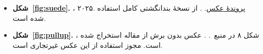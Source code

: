 \begin{itemize}
  \item \textbf{شکل~\ref{fig:suede}.} ، ۲۰۲۵.
  \href{https://commons.wikimedia.org/wiki/File:Suede_jacket.jpg}{پروندۀ عکس}.
  . از نسخۀ بندانگشتی کامل استفاده شده است.

  \item \textbf{شکل~\ref{fig:pullup}.} ، شکل ۸ در منبع~\cite{pullup}.
  . عکس بدون برش از مقاله استخراج شده است. مجوز استفاده از این عکس غیرتجاری است.
\end{itemize}
